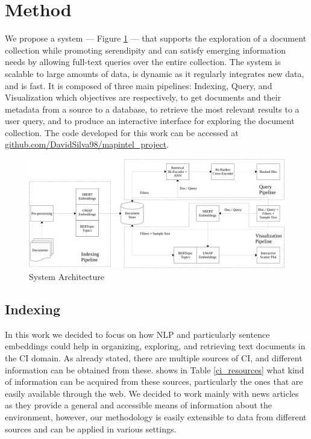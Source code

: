 \documentclass[a4paper]{article}
\begin{document}

\section{Method}
We propose a system — Figure \ref{system_architecture} — that supports the exploration of a document collection while promoting serendipity and can satisfy emerging information needs by allowing full-text queries over the entire collection.
The system is scalable to large amounts of data, is dynamic as it regularly integrates new data, and is fast. It is composed of three main pipelines: Indexing, Query, and Visualization which objectives are respectively, to get documents and their metadata from a source to a database, to retrieve the most relevant results to a user query, and to produce an interactive interface for exploring the document collection. The code developed for this work can be accessed at \href{https://github.com/DavidSilva98/mapintel_project}{github.com/DavidSilva98/mapintel\_project}.

\begin{figure}[H]
	\centering
	\includegraphics[scale=0.5]{./figures/system_architecture}
	\caption{System Architecture}
	\label{system_architecture}
\end{figure}

\subsection{Indexing} \label{indexing}
In this work we decided to focus on how NLP and particularly sentence embeddings could help in organizing, exploring, and retrieving text documents in the CI domain. As already stated, there are multiple sources of CI, and different information can be obtained from these. \citet{dey2011} shows in Table \ref{ci_resources} what kind of information can be acquired from these sources, particularly the ones that are easily available through the web. We decided to work mainly with news articles as they provide a general and accessible means of information about the environment, however, our methodology is easily extensible to data from different sources and can be applied in various settings. 
\end{document}
